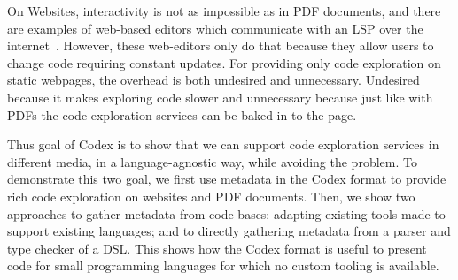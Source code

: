 



%



On Websites, interactivity is not as impossible as in PDF documents, and there are examples of web-based editors which communicate with an LSP over the internet~\autocite{che, theia}.
However, these web-editors only do that because they allow users to change code requiring constant updates.
For providing only code exploration on static webpages, the overhead is both undesired and unnecessary.
Undesired because it makes exploring code slower and unnecessary because just like with PDFs the code exploration services can be baked in to the page.

Thus goal of Codex is to show that we can support code exploration services in different media, in a language-agnostic way, while avoiding the \problem{\times} problem.
To demonstrate this two goal, we first use metadata in the Codex format to provide rich code exploration on websites and PDF documents.
Then, we show two approaches to gather metadata from code bases: adapting existing tools made to support existing languages; and to directly gathering metadata from a parser and type checker of a \ac{DSL}.
This shows how the Codex format is useful to present code for small programming languages for which no custom tooling is available.



